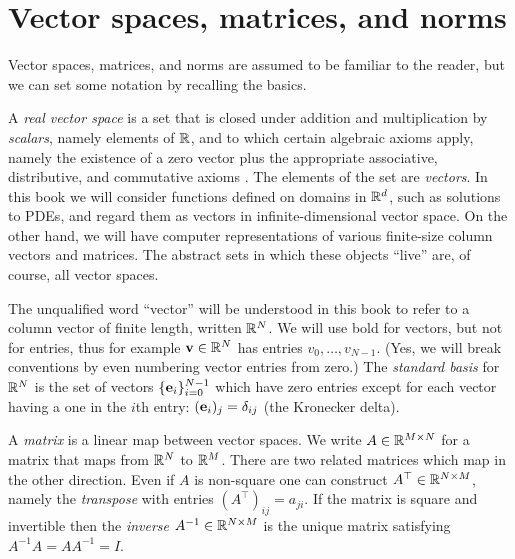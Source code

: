 
\section{Vector spaces, matrices, and norms}

Vector spaces, matrices, and norms are assumed to be familiar to the reader, but we can set some notation by recalling the basics.

A \emph{real vector space} is a set that is closed under addition and multiplication by \emph{scalars}, namely elements of $\mathbb{R}$, and to which certain algebraic axioms apply, namely the existence of a zero vector plus the appropriate associative, distributive, and commutative axioms \citep{Strang2009}.  The elements of the set are \emph{vectors}.  In this book we will consider functions defined on domains in $\mathbb{R}^d$, such as solutions to PDEs, and regard them as vectors in infinite-dimensional vector space.  On the other hand, we will have computer representations of various finite-size column vectors and matrices.  The abstract sets in which these objects ``live'' are, of course, all vector spaces.

The unqualified word ``vector'' will be understood in this book to refer to a column vector of finite length, written $\mathbb{R}^N$.  We will use bold for vectors, but not for entries, thus for example $\mathbf{v}\in\mathbb{R}^N$ has entries $v_0,\dots,v_{N-1}$.  (Yes, we will break conventions by even numbering vector entries from zero.)  The \emph{standard basis} for $\mathbb{R}^N$ is the set of vectors $\{\mathbf{e}_i\}_{i=0}^{N-1}$ which have zero entries except for each vector having a one in the $i$th entry: $(\mathbf{e}_i)_j = \delta_{ij}$ (the Kronecker delta).

A \emph{matrix} is a linear map between vector spaces.  We write $A\in \mathbb{R}^{M\times N}$ for a matrix that maps from $\mathbb{R}^N$ to $\mathbb{R}^M$.  There are two related matrices which map in the other direction.  Even if $A$ is non-square one can construct $A^\top\in \mathbb{R}^{N\times M}$, namely the \emph{transpose} with entries $(A^\top)_{ij}=a_{ji}$.  If the matrix is square and invertible then the \emph{inverse} $A^{-1}\in \mathbb{R}^{N\times M}$ is the unique matrix satisfying $A^{-1} A = A A^{-1}=I$.

